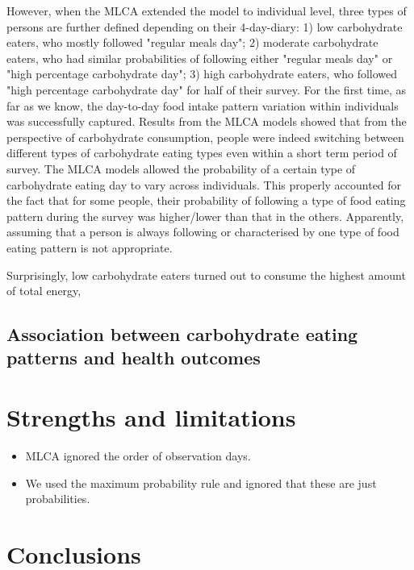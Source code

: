 However, when the MLCA extended the model to individual level, three types of persons are further defined depending on their 4-day-diary: 1) low carbohydrate eaters, who mostly followed "regular meals day"; 2) moderate carbohydrate eaters, who had similar probabilities of following either "regular meals day" or "high percentage carbohydrate day"; 3) high carbohydrate eaters, who followed "high percentage carbohydrate day" for half of their survey. For the first time, as far as we know, the day-to-day food intake pattern variation within individuals was successfully captured. Results from the MLCA models showed that from the perspective of carbohydrate consumption, people were indeed switching between different types of carbohydrate eating types even within a short term period of survey. The MLCA models allowed the probability of a certain type of carbohydrate eating day to vary across individuals. This properly accounted for the fact that for some people, their probability of following a type of food eating pattern during the survey was higher/lower than that in the others. Apparently, assuming that a person is always following or characterised by one type of food eating pattern is not appropriate.

Surprisingly, low carbohydrate eaters turned out to consume the highest amount of total energy, 




\subsection{Association between carbohydrate eating patterns and health outcomes}












\section{Strengths and limitations}



\begin{itemize}
	\item MLCA ignored the order of observation days.
	\item We used the maximum probability rule and ignored that these are just probabilities.
\end{itemize}



\section{Conclusions}